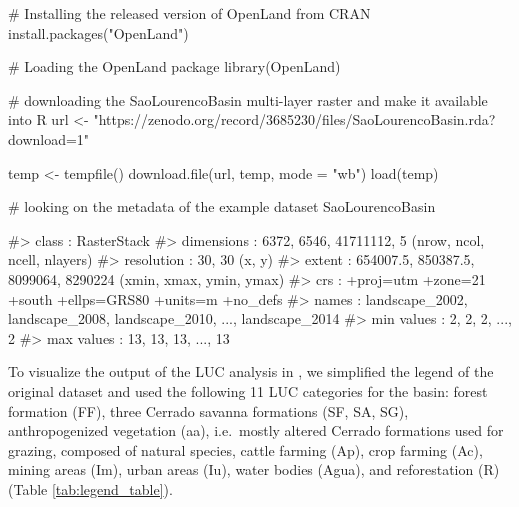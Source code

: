 \begin{Schunk}
\begin{Sinput}
# Installing the released version of OpenLand from CRAN
install.packages("OpenLand")

# Loading the OpenLand package
library(OpenLand)

# downloading the SaoLourencoBasin multi-layer raster and make it available into R
url <- "https://zenodo.org/record/3685230/files/SaoLourencoBasin.rda?download=1"

temp <- tempfile()
download.file(url, temp, mode = "wb")
load(temp)

# looking on the metadata of the example dataset
SaoLourencoBasin 
\end{Sinput}
\begin{Soutput}
#> class      : RasterStack 
#> dimensions : 6372, 6546, 41711112, 5  (nrow, ncol, ncell, nlayers)
#> resolution : 30, 30  (x, y)
#> extent     : 654007.5, 850387.5, 8099064, 8290224  (xmin, xmax, ymin, ymax)
#> crs        : +proj=utm +zone=21 +south +ellps=GRS80 +units=m +no_defs 
#> names      : landscape_2002, landscape_2008, landscape_2010, ..., landscape_2014 
#> min values :              2,              2,              2, ...,              2 
#> max values :             13,             13,             13, ...,             13
\end{Soutput}
\end{Schunk}

To visualize the output of the LUC analysis in , we simplified
the legend of the original dataset and used the following 11 LUC
categories for the basin: forest formation (FF), three Cerrado savanna
formations (SF, SA, SG), anthropogenized vegetation (aa), i.e.~mostly
altered Cerrado formations used for grazing, composed of natural
species, cattle farming (Ap), crop farming (Ac), mining areas (Im),
urban areas (Iu), water bodies (Agua), and reforestation (R) (Table
\ref{tab:legend_table}).

